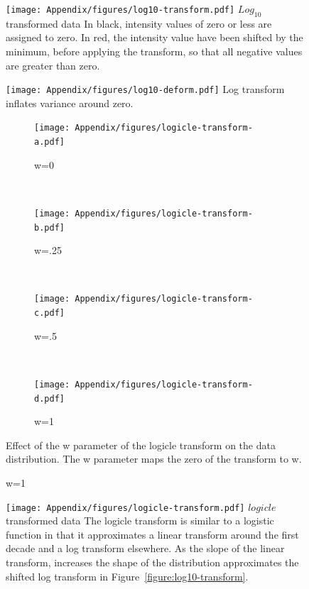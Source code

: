 \begin{figure}[h]
\centering
\texttt{[image: Appendix/figures/log10-transform.pdf]}
{$Log_{10}$ transformed data}
{
  In black, intensity values of zero or less are assigned to zero.
  In red, the intensity value have been shifted by the minimum, before applying the transform, so that all negative values are greater than zero.
}
\end{figure}

\begin{figure}
\centering
\texttt{[image: Appendix/figures/log10-deform.pdf]}
{Log transform inflates variance around zero.}
{
}
\end{figure}


\begin{figure}[h]
\centering
\begin{subfigure}[b]{.4\textwidth}
    \centering
    \texttt{[image: Appendix/figures/logicle-transform-a.pdf]}
    \caption{w=0}
\end{subfigure}
~
\begin{subfigure}[b]{.4\textwidth}
    \centering
    \texttt{[image: Appendix/figures/logicle-transform-b.pdf]}
    \caption{w=.25}
\end{subfigure}
~
\begin{subfigure}[b]{.4\textwidth}
    \centering
    \texttt{[image: Appendix/figures/logicle-transform-c.pdf]}
    \caption{w=.5}
\end{subfigure}
~
\begin{subfigure}[b]{.4\textwidth}
    \centering
    \texttt{[image: Appendix/figures/logicle-transform-d.pdf]}
    \caption{w=1}
\end{subfigure}
{Effect of the w parameter of the logicle transform on the data distribution.}
{
  The w parameter maps the zero of the transform to w.
}
\end{figure}

\begin{figure}[h]
\centering
\texttt{[image: Appendix/figures/logicle-transform.pdf]}
{$logicle$ transformed data}
{
  The logicle transform is similar to a logistic function in that it approximates a linear transform around the first decade
  and a log transform elsewhere.
  As the slope of the linear transform, increases the shape of the distribution approximates the shifted log transform in Figure~\ref{figure:log10-transform}.
}
\end{figure}


